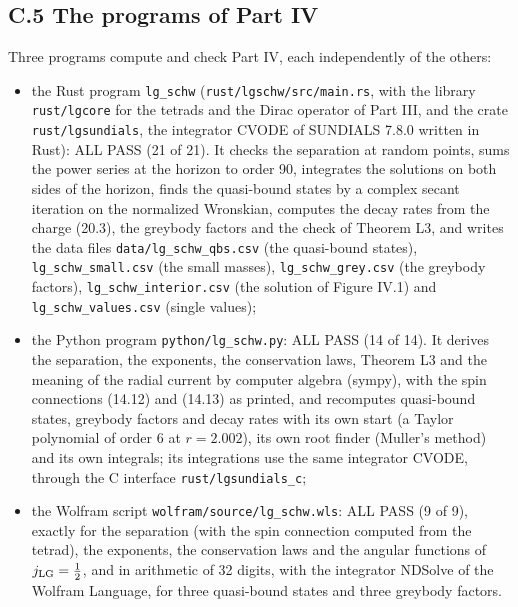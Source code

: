\documentclass[
  10pt,
]{article}
\providecommand{\tightlist}{%
  \setlength{\itemsep}{0pt}\setlength{\parskip}{0pt}}
\begin{document}
\hypertarget{c.5-the-programs-of-part-iv}{%
\subsection{C.5 The programs of Part
IV}\label{c.5-the-programs-of-part-iv}}

Three programs compute and check Part IV, each independently of the
others:

\begin{itemize}
\tightlist
\item
  the Rust program \texttt{lg\_schw} (\texttt{rust/lgschw/src/main.rs},
  with the library \texttt{rust/lgcore} for the tetrads and the Dirac
  operator of Part III, and the crate \texttt{rust/lgsundials}, the
  integrator CVODE of SUNDIALS 7.8.0 written in Rust): ALL PASS (21 of
  21). It checks the separation at random points, sums the power series
  at the horizon to order 90, integrates the solutions on both sides of
  the horizon, finds the quasi-bound states by a complex secant
  iteration on the normalized Wronskian, computes the decay rates from
  the charge (20.3), the greybody factors and the check of Theorem L3,
  and writes the data files \texttt{data/lg\_schw\_qbs.csv} (the
  quasi-bound states), \texttt{lg\_schw\_small.csv} (the small masses),
  \texttt{lg\_schw\_grey.csv} (the greybody factors),
  \texttt{lg\_schw\_interior.csv} (the solution of Figure IV.1) and
  \texttt{lg\_schw\_values.csv} (single values);
\item
  the Python program \texttt{python/lg\_schw.py}: ALL PASS (14 of 14).
  It derives the separation, the exponents, the conservation laws,
  Theorem L3 and the meaning of the radial current by computer algebra
  (sympy), with the spin connections (14.12) and (14.13) as printed, and
  recomputes quasi-bound states, greybody factors and decay rates with
  its own start (a Taylor polynomial of order 6 at \(r=2.002\)), its own
  root finder (Muller's method) and its own integrals; its integrations
  use the same integrator CVODE, through the C interface
  \texttt{rust/lgsundials\_c};
\item
  the Wolfram script \texttt{wolfram/source/lg\_schw.wls}: ALL PASS (9
  of 9), exactly for the separation (with the spin connection computed
  from the tetrad), the exponents, the conservation laws and the angular
  functions of \(j_{\rm LG}=\tfrac12\), and in arithmetic of 32 digits,
  with the integrator NDSolve of the Wolfram Language, for three
  quasi-bound states and three greybody factors.
\end{itemize}
\end{document}
